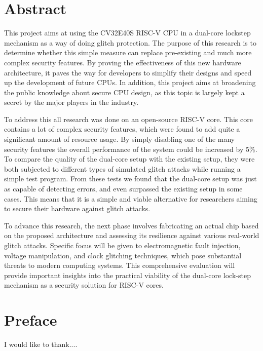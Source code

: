 \chapter{Abstract}

This project aims at using the CV32E40S RISC-V CPU in a dual-core lockstep mechanism as a way of doing glitch protection. The purpose of this research is to determine whether this simple measure can replace pre-existing and much more complex security features. By proving the effectiveness of this new hardware architecture, it paves the way for developers to simplify their designs and speed up the development of future CPUs. In addition, this project aims at broadening the public knowledge about secure CPU design, as this topic is largely kept a secret by the major players in the industry. 

To address this all research was done on an open-source RISC-V core. This core contains a lot of complex security features, which were found to add quite a significant amount of resource usage. By simply disabling one of the many security features the overall performance of the system could be increased by 5\%. To compare the quality of the dual-core setup with the existing setup, they were both subjected to different types of simulated glitch attacks while running a simple test program. From these tests we found that the dual-core setup was just as capable of detecting errors, and even surpassed the existing setup in some cases. This means that it is a simple and viable alternative for researchers aiming to secure their hardware against glitch attacks. 

To advance this research, the next phase involves fabricating an actual chip based on the proposed architecture and assessing its resilience against various real-world glitch attacks. Specific focus will be given to electromagnetic fault injection, voltage manipulation, and clock glitching techniques, which pose substantial threats to modern computing systems. This comprehensive evaluation will provide important insights into the practical viability of the dual-core lock-step mechanism as a security solution for RISC-V cores.

\chapter{Preface}
I would like to thank....

